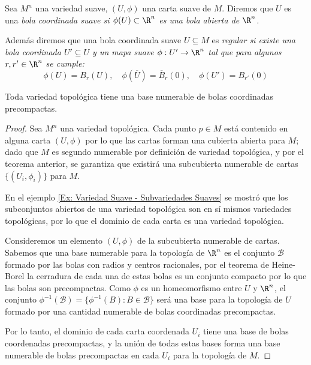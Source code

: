 \begin{definition}\label{Definición: Bolas Coordinadas Suaves}
  Sea $M^n$ una variedad suave, $(U,\phi)$ una carta suave de $M$. Diremos que $U$ es una \it{bola coordinada suave} si $\phi(U) \subset \R^n$ es una bola abierta de $\R^n$.
  
  Además diremos que una bola coordinada suave $U \subseteq M$ es \it{regular} si existe una bola coordinada $U' \subseteq U$ y un mapa suave $\phi: U' \to \R^n$ tal que para algunos $r, r' \in \R^n$ se cumple:
  \[
    \phi(U) = B_r(U), \quad \phi(\overline{U}) = \overline{B}_r(0), \quad \phi(U') = B_{r'}(0)
  \] 
\end{definition}

\begin{lemma}\label{Lemma: Bolas Precompactas}
  Toda variedad topológica tiene una base numerable de bolas coordinadas precompactas.
\end{lemma}

\begin{proof}
  Sea $M^n$ una variedad topológica. Cada punto $p \in M$ está contenido en alguna carta $(U,\phi)$ por lo que las cartas forman una cubierta abierta para $M$; dado que $M$ es segundo numerable por definición de variedad topológica, y por el teorema anterior, se garantiza que existirá una subcubierta numerable de cartas $\{(U_i,\phi_i)\}$ para $M$.

  En el ejemplo \ref{Ex: Variedad Suave - Subvariedades Suaves} se mostró que los subconjuntos abiertos de una variedad topológica son en sí mismos variedades topológicas, por lo que el dominio de cada carta es una variedad topológica.

  Consideremos un elemento $(U,\phi)$ de la subcubierta numerable de cartas. Sabemos que una base numerable para la topología de $\R^n$ es el conjunto $\mathcal{B}$ formado por las bolas con radios y centros racionales, por el teorema de Heine-Borel la cerradura de cada una de estas bolas es un conjunto compacto por lo que las bolas son precompactas. Como $\phi$ es un homeomorfismo entre $U$ y $\R^n$, el conjunto $\phi^{-1} (\mathcal{B})= \{\phi^{-1}(B): B \in \mathcal{B}\}$ será una base para la topología de $U$ formado por una cantidad numerable de bolas coordinadas precompactas.

  Por lo tanto, el dominio de cada carta coordenada $U_i$ tiene una base de bolas coordenadas precompactas, y la unión de todas estas bases forma una base numerable de bolas precompactas en cada $U_i$ para la topología de $M$.
\end{proof}


